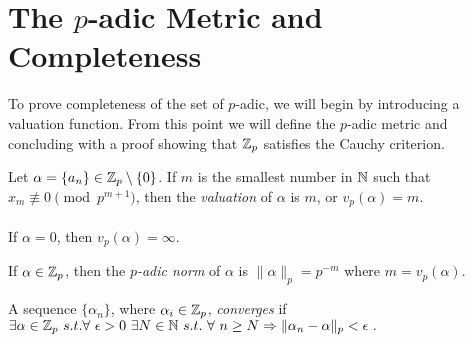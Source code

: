 \section{The $p$-adic Metric and Completeness}
  To prove completeness of the set of $p$-adic, we will begin
  by introducing a valuation function. From this point we will
  define the $p$-adic metric and concluding with a proof showing
  that $\mathbb{Z}_p$ satisfies the Cauchy criterion.

\label{pval}
\begin{definition}
  Let $\alpha=\{a_n\}\in\mathbb{Z}_p\setminus\{0\}$. If $m$ is the smallest
  number in $\mathbb{N}$ such that $x_m \not\equiv 0 \pmod p^{m+1}$,
	then the {\em valuation} of $\alpha$ is $m$, or $v_p(\alpha)=m$. \\ \\
  
  If $\alpha=0$, then $v_p(\alpha)=\infty$.
\end{definition}

\label{pnorm}
\begin{definition}
	If $\alpha \in \mathbb{Z}_p$, then the {\em $p$-adic norm} of $\alpha$ is
  $\lVert \alpha \rVert_p = p^{-m}$ where $m = v_p(\alpha)$. 
\end{definition}

%
% 

\begin{definition} \label{def:cauchy}
	A sequence $\{\alpha_n\}$, where $\alpha_i\in\mathbb{Z}_p$, {\em converges}
  if \ $\exists\alpha\in\zzzp \ s.t. \\ \forall \ \epsilon>0 \ 
  \exists N \in\nnn \ s.t. \ \forall \ n \geq N \Rightarrow \lVert\alpha_n-\alpha\rVert_p<\epsilon \ .$
\end{definition}
